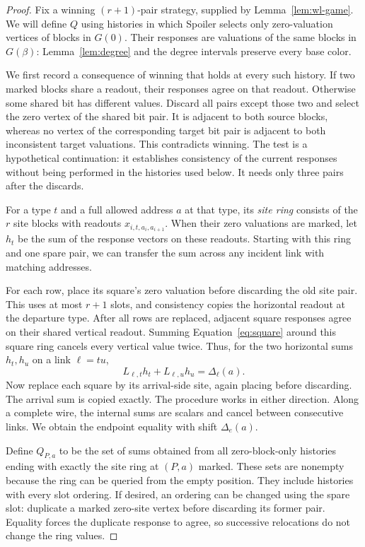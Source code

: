 \begin{proof}
Fix a winning $(r+1)$-pair strategy, supplied by
Lemma~\ref{lem:wl-game}. We will define $Q$ using histories in which
Spoiler selects only zero-valuation vertices of blocks in $G(0)$.
Their responses are valuations of the same blocks in $G(\beta)$:
Lemma~\ref{lem:degree} and the degree intervals preserve every base
color.

We first record a consequence of winning that holds at every such
history. If two marked blocks share a readout, their responses agree
on that readout. Otherwise some shared bit has different values.
Discard all pairs except those two and select the zero vertex of
the shared bit pair. It is adjacent to both source blocks, whereas
no vertex of the corresponding target bit pair is adjacent to both
inconsistent target valuations. This contradicts winning. The test
is a hypothetical continuation: it establishes consistency of the
current responses without being performed in the histories used
below. It needs only three pairs after the discards.

For a type $t$ and a full allowed address $a$ at that type, its
\emph{site ring} consists of the $r$ site blocks with readouts
$x_{i,t,a_i,a_{i+1}}$. When their zero valuations are marked, let
$h_t$ be the sum of the response vectors on these readouts.
Starting with this ring and one spare pair, we can transfer the sum
across any incident link with matching addresses.

For each row, place its square's zero valuation before discarding
the old site pair. This uses at most $r+1$ slots, and consistency
copies the horizontal readout at the departure type. After all rows
are replaced, adjacent square responses agree on their shared
vertical readout. Summing Equation~\eqref{eq:square} around this
square ring cancels every vertical value twice. Thus, for the two
horizontal sums $h_t,h_u$ on a link $\ell=tu$,
\begin{equation}
                  L_{\ell,t}h_t+L_{\ell,u}h_u
                  =\Delta_\ell(a).
 \label{eq:link-sum}
\end{equation}
Now replace each square by its arrival-side site, again placing
before discarding. The arrival sum is copied exactly. The procedure
works in either direction. Along a complete wire, the internal
sums are scalars and cancel between consecutive links. We obtain
the endpoint equality with shift $\Delta_e(a)$.

Define $Q_{P,a}$ to be the set of sums obtained from all
zero-block-only histories ending with exactly the site ring at
$(P,a)$ marked. These sets are nonempty because the ring can be
queried from the empty position. They include histories with every
slot ordering. If desired, an ordering can be changed using the
spare slot: duplicate a marked zero-site vertex before discarding
its former pair. Equality forces the duplicate response to agree,
so successive relocations do not change the ring values.


\end{proof}
